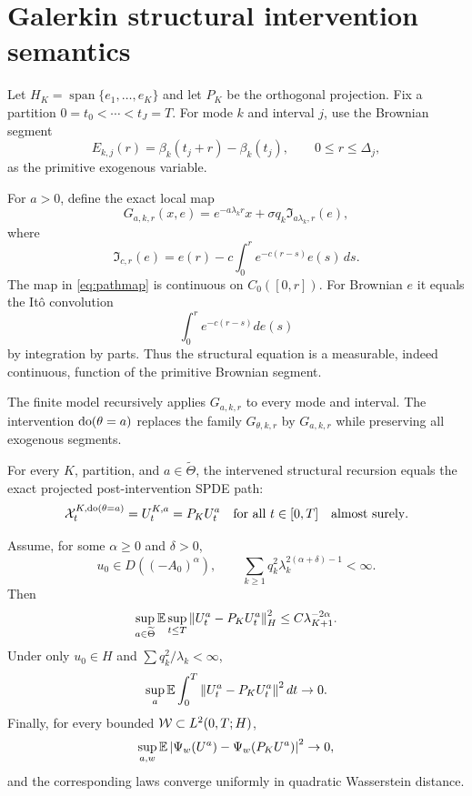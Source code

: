 \section{Galerkin structural intervention semantics}\label{sec:semantics}

Let $H_K=\operatorname{span}\{e_1,\ldots,e_K\}$ and let $P_K$ be the orthogonal projection. Fix a partition $0=t_0<\cdots<t_J=T$. For mode $k$ and interval $j$, use the Brownian segment
\[
 E_{k,j}(r)=\beta_k(t_j+r)-\beta_k(t_j),
 \qquad 0\le r\le\Delta_j,
\]
as the primitive exogenous variable.

For $a>0$, define the exact local map
\[
 G_{a,k,r}(x,e)
 =e^{-a\lambda_kr}x
 +\sigma q_k\mathfrak I_{a\lambda_k,r}(e),
\]
where
\begin{equation}\label{eq:pathmap}
 \mathfrak I_{c,r}(e)
 =e(r)-c\int_0^r e^{-c(r-s)}e(s)\,ds.
\end{equation}
The map in \eqref{eq:pathmap} is continuous on $C_0([0,r])$. For Brownian $e$ it equals the It\^o convolution
\[
 \int_0^r e^{-c(r-s)}de(s)
\]
by integration by parts. Thus the structural equation is a measurable, indeed continuous, function of the primitive Brownian segment.

The finite model recursively applies $G_{a,k,r}$ to every mode and interval. The intervention $\operatorname{do}(\theta=a)$ replaces the family $G_{\theta,k,r}$ by $G_{a,k,r}$ while preserving all exogenous segments.

\begin{proposition}\label{prop:exact-scm}
For every $K$, partition, and $a\in\widetilde\Theta$, the intervened structural recursion equals the exact projected post-intervention SPDE path:
\[
 \mathcal X_t^{K,\operatorname{do}(\theta=a)}
 =U_t^{K,a}
 =P_KU_t^a
 \quad\text{for all }t\in[0,T]
 \quad\text{almost surely}.
\]
\end{proposition}

\begin{theorem}\label{thm:semantics}
Assume, for some $\alpha\ge0$ and $\delta>0$,
\[
 u_0\in D((-A_0)^\alpha),
 \qquad
 \sum_{k\ge1}q_k^2\lambda_k^{2(\alpha+\delta)-1}<\infty.
\]
Then
\[
 \sup_{a\in\widetilde\Theta}
 \mathbb E\sup_{t\le T}
 \left\lVert U_t^a-P_KU_t^a\right\rVert_H^2
 \le C\lambda_{K+1}^{-2\alpha}.
\]
Under only $u_0\in H$ and $\sum q_k^2/\lambda_k<\infty$,
\[
 \sup_a\mathbb E\int_0^T\left\lVert U_t^a-P_KU_t^a\right\rVert^2dt\to0.
\]
Finally, for every bounded $\mathcal W\subset L^2(0,T;H)$,
\[
 \sup_{a,w}
 \mathbb E\left\lvert\Psi_w(U^a)-\Psi_w(P_KU^a)\right\rvert^2\to0,
\]
and the corresponding laws converge uniformly in quadratic Wasserstein distance.
\end{theorem}


